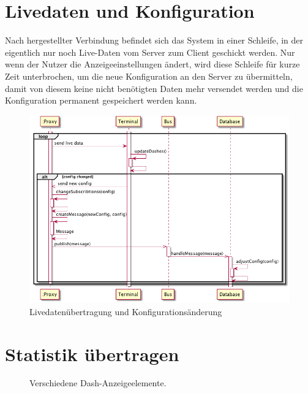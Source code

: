 \documentclass[entwurf.tex]{subfiles}
\begin{document}
  	\section{Livedaten und Konfiguration}
  	\label{Sequence:LiveDataNewConfig}
  		Nach hergestellter Verbindung befindet sich das System in einer Schleife, in der eigentlich nur noch Live-Daten vom Server zum Client geschickt werden. Nur wenn der Nutzer die Anzeigeeinstellungen ändert, wird diese Schleife für kurze Zeit unterbrochen, um die neue Konfiguration an den Server zu übermitteln, damit von diesem keine nicht benötigten Daten mehr versendet werden und die Konfiguration permanent gespeichert werden kann.
  		\begin{figure}[H]
  			\begin{center}
 				\includegraphics[width=\textwidth]{diagrams/ChangeDashConfig.png}
  				\caption{Livedatenübertragung und Konfigurationsänderung}
  			\end{center}
  		\end{figure}
  		
  	\section{Statistik übertragen}
  		
  		\begin{figure}[H]
  			\caption{Verschiedene Dash-Anzeigeelemente.}
  		\end{figure}
  		
  	
\end{document}
